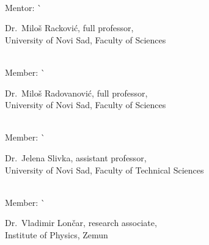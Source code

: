 \begin{tabbing}
\begin{minipage}[t]{.7\textwidth}
    \vspace*{1mm}
    \end{minipage}                                          \\
  Mentor:                  \`
    \begin{minipage}[t]{.7\textwidth}
    Dr.~Miloš Racković, full professor,\\
    University of Novi Sad, Faculty of Sciences
    \vspace*{1mm}
    \end{minipage}                                          \\
  Member:                  \`
    \begin{minipage}[t]{.7\textwidth}
    Dr.~Miloš Radovanović, full professor,\\
    University of Novi Sad, Faculty of Sciences
    \vspace*{1mm}
    \end{minipage}                                          \\
  Member:                  \`
    \begin{minipage}[t]{.7\textwidth}
    Dr.~Jelena Slivka, assistant professor,\\
    University of Novi Sad, Faculty of Technical Sciences
    \vspace*{1mm}
    \end{minipage}                                          \\
  Member:                  \`
    \begin{minipage}[t]{.7\textwidth}
    Dr.~Vladimir Lončar, research associate,\\
    Institute of Physics, Zemun
    \vspace*{1mm}
    \end{minipage}                                          \\
\end{tabbing}
